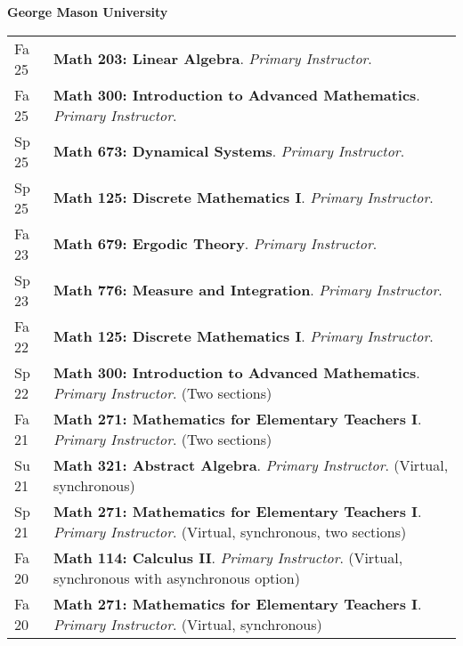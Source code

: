 
    \medskip


    \medskip
    \medskip



    \textbf{\large George Mason University}
    
    \begin{center}
    {
    \renewcommand{\arraystretch}{1.2}
    \begin{longtable}{p{}  p{}}
      Fa 25 & \textbf{{\normalfont Math 203:} Linear Algebra}. \textit{Primary Instructor}.  \\ 
  Fa 25 & \textbf{{\normalfont Math 300:} Introduction to Advanced Mathematics}. \textit{Primary Instructor}.  \\ 
  Sp 25 & \textbf{{\normalfont Math 673:} Dynamical Systems}. \textit{Primary Instructor}.  \\ 
  Sp 25 & \textbf{{\normalfont Math 125:} Discrete Mathematics I}. \textit{Primary Instructor}.  \\ 
  Fa 23 & \textbf{{\normalfont Math 679:} Ergodic Theory}. \textit{Primary Instructor}.  \\ 
  Sp 23 & \textbf{{\normalfont Math 776:} Measure and Integration}. \textit{Primary Instructor}.  \\ 
  Fa 22 & \textbf{{\normalfont Math 125:} Discrete Mathematics I}. \textit{Primary Instructor}.  \\ 
  Sp 22 & \textbf{{\normalfont Math 300:} Introduction to Advanced Mathematics}. \textit{Primary Instructor}. (Two sections) \\ 
  Fa 21 & \textbf{{\normalfont Math 271:} Mathematics for Elementary Teachers I}. \textit{Primary Instructor}. (Two sections) \\ 
  Su 21 & \textbf{{\normalfont Math 321:} Abstract Algebra}. \textit{Primary Instructor}. (Virtual, synchronous) \\ 
  Sp 21 & \textbf{{\normalfont Math 271:} Mathematics for Elementary Teachers I}. \textit{Primary Instructor}. (Virtual, synchronous, two sections) \\ 
  Fa 20 & \textbf{{\normalfont Math 114:} Calculus II}. \textit{Primary Instructor}. (Virtual, synchronous with asynchronous option) \\ 
  Fa 20 & \textbf{{\normalfont Math 271:} Mathematics for Elementary Teachers I}. \textit{Primary Instructor}. (Virtual, synchronous) 
    \end{longtable}
    } 
    \end{center}

